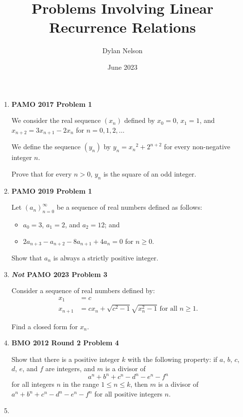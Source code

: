 \documentclass{article}
\title{Problems Involving Linear Recurrence Relations}
\author{Dylan Nelson}
\date{June 2023}
\begin{document}
\maketitle

\begin{enumerate}

\item {\textbf{PAMO 2017 Problem 1}}

We consider the real sequence $(x_n)$ defined by $x_0 = 0$, $x_1 = 1$, and $x_{n + 2} = 3x_{n + 1} - 2x_n$ for $n = 0, 1, 2, \dots$

We define the sequence $(y_n)$ by $y_n = {x_n}^2 + 2^{n + 2}$ for every non-negative integer $n$.

Prove that for every $n > 0$, $y_n$ is the square of an odd integer.

\item {\textbf{PAMO 2019 Problem 1}}

Let $(a_n)_{n = 0}^{\infty}$ be a sequence of real numbers defined as follows:
\begin{itemize}
    \item $a_0 = 3$, $a_1 = 2$, and $a_2 = 12$; and
    \item $2a_{n + 3} - a_{n + 2} - 8a_{n + 1} + 4a_n = 0$ for $n \geq 0$.
\end{itemize}

Show that $a_n$ is always a strictly positive integer.

\item {\textbf{{\itshape Not} PAMO 2023 Problem 3}}

Consider a sequence of real numbers defined by:
\begin{align*}
    x_1 & = c \\
    x_{n + 1} & = cx_n + \sqrt{c^2 - 1} \sqrt{x_n^2 - 1} \text{ for all } n \geq 1.
\end{align*}

Find a closed form for $x_n$.

\item {\textbf{BMO 2012 Round 2 Problem 4}}

Show that there is a positive integer $k$ with the following property: if $a$, $b$, $c$, $d$, $e$, and $f$ are integers, and $m$ is a divisor of
\[
    a^n + b^n + c^n - d^n - e^n - f^n
\]
for all integers $n$ in the range $1 \leq n \leq k$, then $m$ is a divisor of $a^n + b^n + c^n - d^n - e^n - f^n$ for all positive integers $n$.

\item


\end{enumerate}
\end{document}
